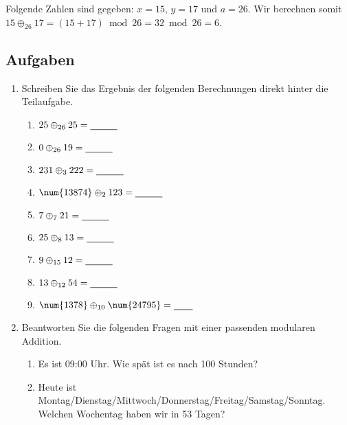 \begin{example}
Folgende Zahlen sind gegeben: $x = 15$, $y = 17$ und $a = 26$. Wir berechnen somit $15 \oplus_{26} 17 = (15 + 17) \bmod 26 = 32 \bmod 26 = 6$.
\end{example}

\subsection{Aufgaben}

\begin{enumerate}
	\item Schreiben Sie das Ergebnis der folgenden Berechnungen direkt hinter die Teilaufgabe.

\begin{multicols}{3}
\begin{enumerate}
\item $25 \oplus_{26} 25 = \rule[-0.75mm]{1cm}{.5pt}$
\item $0 \oplus_{26} 19 = \rule[-0.75mm]{1cm}{.5pt}$
\item $231 \oplus_{3} 222 = \rule[-0.75mm]{1cm}{.5pt}$
\item $\num{13874} \oplus_{2} 123 = \rule[-0.75mm]{1cm}{.5pt}$
\item $7 \oplus_{7} 21 = \rule[-0.75mm]{1cm}{.5pt}$
\item $25 \oplus_{8} 13 = \rule[-0.75mm]{1cm}{.5pt}$
\item $9 \oplus_{15} 12 = \rule[-0.75mm]{1cm}{.5pt}$
\item $13 \oplus_{12} 54 = \rule[-0.75mm]{1cm}{.5pt}$
\item $\num{1378} \oplus_{10} \num{24795} = \rule[-0.75mm]{0.7cm}{.5pt}$
\end{enumerate}
\end{multicols}

\item Beantworten Sie die folgenden Fragen mit einer passenden modularen Addition.

\begin{enumerate}
	\item Es ist 09:00 Uhr. Wie spät ist es nach \num{100} Stunden?
	
	\fillwithgrid{0.5in}
	
	\item Heute ist Montag/Dienstag/Mittwoch/Donnerstag/Freitag/Samstag/Sonntag. Welchen Wochentag haben wir in \num{53} Tagen?
	
	\fillwithgrid{0.5in}
\end{enumerate}

\end{enumerate}

